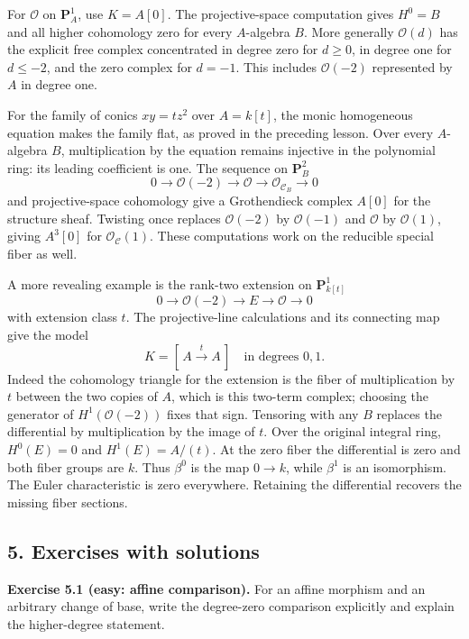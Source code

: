 \documentclass[11pt]{article}
\begin{document}
For \(\mathcal O\) on \(\mathbf P^1_A\), use \(K=A[0]\). The
projective-space computation gives \(H^0=B\) and all higher cohomology
zero for every \(A\)-algebra \(B\). More generally \(\mathcal O(d)\) has
the explicit free complex concentrated in degree zero for \(d\geq0\), in
degree one for \(d\leq-2\), and the zero complex for \(d=-1\). This
includes \(\mathcal O(-2)\) represented by \(A\) in degree one.

For the family of conics \(xy=tz^2\) over \(A=k[t]\), the monic
homogeneous equation makes the family flat, as proved in the preceding
lesson. Over every \(A\)-algebra \(B\), multiplication by the equation
remains injective in the polynomial ring: its leading coefficient is
one. The sequence on \(\mathbf P^2_B\) \[
0\to\mathcal O(-2)\to\mathcal O\to\mathcal O_{\mathcal C_B}\to0
\] and projective-space cohomology give a Grothendieck complex \(A[0]\)
for the structure sheaf. Twisting once replaces \(\mathcal O(-2)\) by
\(\mathcal O(-1)\) and \(\mathcal O\) by \(\mathcal O(1)\), giving
\(A^3[0]\) for \(\mathcal O_{\mathcal C}(1)\). These computations work
on the reducible special fiber as well.

A more revealing example is the rank-two extension on
\(\mathbf P^1_{k[t]}\) \[
0\to\mathcal O(-2)\to E\to\mathcal O\to0
\] with extension class \(t\). The projective-line calculations and its
connecting map give the model \[
K=[\,A\xrightarrow{t}A\,]\quad\text{in degrees }0,1.
\] Indeed the cohomology triangle for the extension is the fiber of
multiplication by \(t\) between the two copies of \(A\), which is this
two-term complex; choosing the generator of \(H^1(\mathcal O(-2))\)
fixes that sign. Tensoring with any \(B\) replaces the differential by
multiplication by the image of \(t\). Over the original integral ring,
\(H^0(E)=0\) and \(H^1(E)=A/(t)\). At the zero fiber the differential is
zero and both fiber groups are \(k\). Thus \(\beta^0\) is the map
\(0\to k\), while \(\beta^1\) is an isomorphism. The Euler
characteristic is zero everywhere. Retaining the differential recovers
the missing fiber sections.

\subsection{5. Exercises with solutions}\label{exercises-with-solutions}

\textbf{Exercise 5.1 (easy: affine comparison).} For an affine morphism
and an arbitrary change of base, write the degree-zero comparison
explicitly and explain the higher-degree statement.
\end{document}
